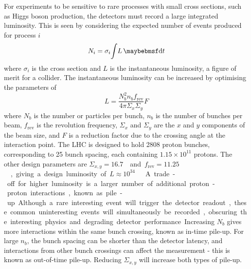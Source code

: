 For experiments to be sensitive to rare processes with small cross sections, such as Higgs 
boson production, the detectors must record a large integrated luminosity. This is seen by 
considering the expected number of events produced for process $i$
\begin{equation}
	N_i = \sigma_i \! \int \! L \, \d{t}
	\label{eq:event_rate}
\end{equation}
where $\sigma_i$ is the cross section and $L$ is the instantaneous luminosity, a figure of 
merit for a collider. The instantaneous luminosity can be increased by optimising the
parameters of
\begin{equation}
	L = \frac{N_b^2 n_b f_{\text{rev}}}{4\pi \varSigma_x \varSigma_y} F
	\label{eq:lumi_beam}
\end{equation}
where $N_b$ is the number or particles per bunch, $n_b$ is the number of bunches per beam, 
$f_{\text{rev}}$ is the revolution frequency, $\varSigma_x$ and $\varSigma_y$ are the $x$ 
and $y$ components of the beam size, and $F$ is a reduction factor due to the crossing 
angle at the interaction point. The \ac{LHC} is designed to hold 2808 proton bunches, 
corresponding to \unit{25}{\nano\second} bunch spacing, each containing $1.15\times10^{11}$
protons. The other design parameters are \unit{$\varSigma_{x,y} = 16.7$}{\micro\metre} 
and \unit{$f_{\text{rev}} = 11.25$}{\kHz}, giving a design luminosity of 
\unit{$L \approx 10^{34}$}{\lumiunits} \cite{LHC}.

A trade-off for higher luminosity is a larger number of additional proton-proton 
interactions, known as pile-up. Although a rare interesting event will trigger the 
detector readout, these common uninteresting events will simultaneously be recorded, 
obscuring the interesting physics and degrading detector performance. Increasing $N_b$ 
gives more interactions within the same bunch crossing, known as in-time pile-up. For 
large $n_b$, the bunch spacing can be shorter than the detector latency, and interactions 
from other bunch crossings can affect the measurement - this is known as out-of-time 
pile-up. Reducing $\varSigma_{x,y}$ will increase both types of pile-up.
